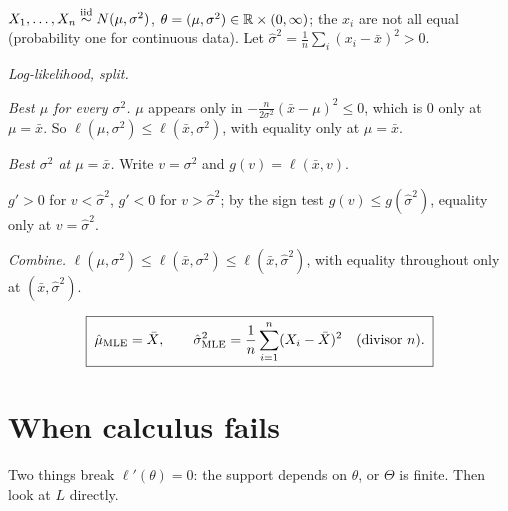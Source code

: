 \begin{example}
$X_1,\dots,X_n\overset{\text{iid}}{\sim} N(\mu,\sigma^2)$, $\theta=(\mu,\sigma^2)\in\mathbb{R}\times(0,\infty)$; the $x_i$ are not all equal (probability one for continuous data). Let $\hat\sigma^2=\frac1n\sum_i(x_i-\bar x)^2>0$.
\begin{steps}
  \item \emph{Log-likelihood, split.}
  \begin{deriv}
  \end{deriv}
  \item \emph{Best $\mu$ for every $\sigma^2$.} $\mu$ appears only in $-\frac{n}{2\sigma^2}(\bar x-\mu)^2\le0$, which is $0$ only at $\mu=\bar x$. So $\boxed{\ell(\mu,\sigma^2)\le\ell(\bar x,\sigma^2)}$, with equality only at $\mu=\bar x$.
  \item \emph{Best $\sigma^2$ at $\mu=\bar x$.} Write $v=\sigma^2$ and $g(v)=\ell(\bar x,v)$.
  \begin{deriv}
  \end{deriv}
  $g'>0$ for $v<\hat\sigma^2$, $g'<0$ for $v>\hat\sigma^2$; by the sign test $\boxed{g(v)\le g(\hat\sigma^2)}$, equality only at $v=\hat\sigma^2$.
  \item \emph{Combine.} $\ell(\mu,\sigma^2)\le\ell(\bar x,\sigma^2)\le\ell(\bar x,\hat\sigma^2)$, with equality throughout only at $(\bar x,\hat\sigma^2)$.
\end{steps}
\[
  \boxed{\;\hat\mu_{\mathrm{MLE}}=\bar X,\qquad\hat\sigma^2_{\mathrm{MLE}}=\frac1n\sum_{i=1}^n(X_i-\bar X)^2\quad(\text{divisor } n).\;}
\]
\end{example}

\section{When calculus fails}

Two things break $\ell'(\theta)=0$: the support depends on $\theta$, or $\Theta$ is finite. Then look at $L$ directly.


